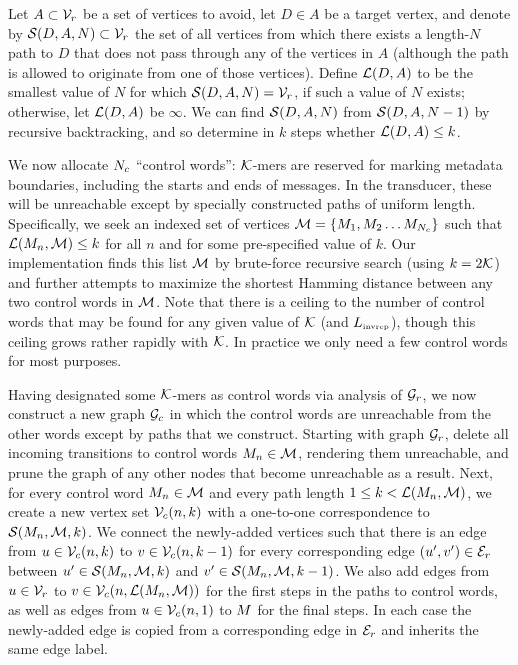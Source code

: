 \documentclass[english]{article}
\begin{document}
Let $A \subset {\cal V}_r$ be a set of vertices to avoid,
let $D \in A$ be a target vertex,
and denote by ${\cal S}(D,A,N) \subset {\cal V}_r$
the set of all vertices
from which there exists a length-$N$ path to $D$
that does not pass through any of the vertices in $A$
(although the path is allowed to originate from one of those vertices).
Define ${\cal L}(D,A)$ to be the smallest value of $N$ for which ${\cal S}(D,A,N) = {\cal V}_r$,
if such a value of $N$ exists; otherwise, let ${\cal L}(D,A)$ be $\infty$.
We can find ${\cal S}(D,A,N)$ from ${\cal S}(D,A,N-1)$ by recursive backtracking,
and so determine in $k$ steps whether ${\cal L}(D,A) \leq k$.

We now allocate $N_c$ ``control words'': ${\cal K}$-mers are reserved for marking metadata boundaries,
including the starts and ends of messages.
In the transducer, these will be unreachable except by specially constructed paths of uniform length.
Specifically, we seek an indexed set of vertices
${\cal M} = \{ M_1, M_2 \ldots M_{N_c} \}$
such that ${\cal L}(M_n,{\cal M}) \leq k$ for all $n$
and for some pre-specified value of $k$.
Our implementation finds this list ${\cal M}$ by brute-force recursive search
(using $k = 2{\cal K}$)
and further attempts to maximize the shortest Hamming distance between any two control words in ${\cal M}$.
Note that there is a ceiling to the number of control words that may be found
for any given value of ${\cal K}$ (and $L_{\mbox{\tiny invrep}}$),
though this ceiling grows rather rapidly with ${\cal K}$.
In practice we only need a few control words for most purposes.

Having designated some ${\cal K}$-mers as control words via analysis of ${\cal G}_r$,
we now construct a new graph ${\cal G}_c$
in which the control words are unreachable from the other words
except by paths that we construct.
Starting with graph ${\cal G}_r$, delete all incoming transitions to control words $M_n \in {\cal M}$,
rendering them unreachable,
and prune the graph of any other nodes that become unreachable as a result.
Next, for every control word $M_n \in {\cal M}$
and every path length $1 \leq k < {\cal L}(M_n,{\cal M})$,
we create a new vertex set ${\cal V}_c(n,k)$
with a one-to-one correspondence to ${\cal S}(M_n,{\cal M},k)$.
We connect the newly-added vertices such that there is an edge from
$u \in {\cal V}_c(n,k)$ to $v \in {\cal V}_c(n,k-1)$
for every corresponding edge $(u',v') \in {\cal E}_r$ between
$u' \in {\cal S}(M_n,{\cal M},k)$
and
$v' \in {\cal S}(M_n,{\cal M},k-1)$.
We also add edges from
$u \in {\cal V}_r$ to $v \in {\cal V}_c(n,{\cal L}(M_n,{\cal M}))$
for the first steps in the paths to control words,
as well as edges from
$u \in {\cal V}_c(n,1)$ to $M$
for the final steps.
In each case the newly-added edge is copied from a corresponding edge in ${\cal E}_r$
and inherits the same edge label.
\end{document}
